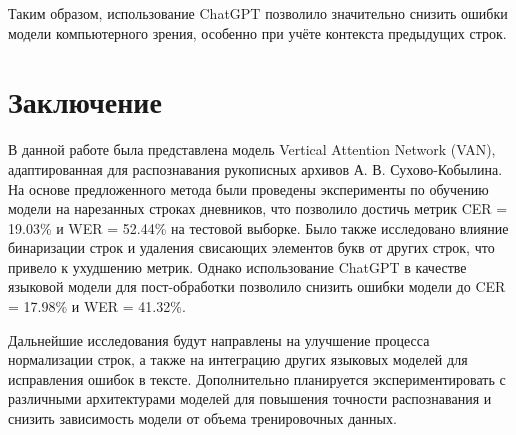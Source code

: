 \documentclass{extarticle}
\begin{document}
Таким образом, использование ChatGPT позволило значительно снизить ошибки модели компьютерного зрения, особенно при учёте контекста предыдущих строк.


\section{Заключение}

В данной работе была представлена модель Vertical Attention Network (VAN), адаптированная для распознавания рукописных архивов А. В. Сухово-Кобылина. На основе предложенного метода были проведены эксперименты по обучению модели на нарезанных строках дневников, что позволило достичь метрик CER = 19.03\% и WER = 52.44\% на тестовой выборке. Было также исследовано влияние бинаризации строк и удаления свисающих элементов букв от других строк, что привело к ухудшению метрик. Однако использование ChatGPT в качестве языковой модели для пост-обработки позволило снизить ошибки модели до CER = 17.98\% и WER = 41.32\%.

Дальнейшие исследования будут направлены на улучшение процесса нормализации строк, а также на интеграцию других языковых моделей для исправления ошибок в тексте. Дополнительно планируется экспериментировать с различными архитектурами моделей для повышения точности распознавания и снизить зависимость модели от объема тренировочных данных.
\end{document}
